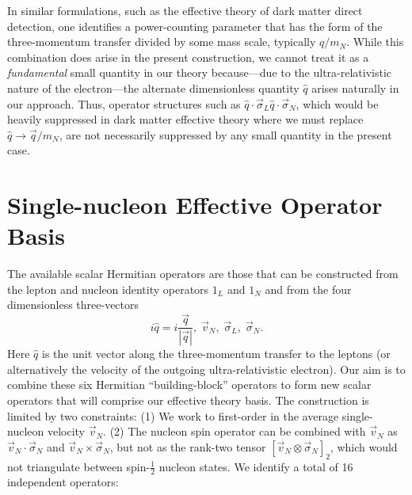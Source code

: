 \documentclass{book}[letterpaper,12pt]
\begin{document}
In similar formulations, such as the effective theory of dark matter direct detection, one identifies a power-counting parameter that has the form of the three-momentum transfer divided by some mass scale, typically $q/m_N$. While this combination does arise in the present construction, we cannot treat it as a \textit{fundamental} small quantity in our theory because---due to the ultra-relativistic nature of the electron---the alternate dimensionless quantity $\hat{q}$ arises naturally in our approach. Thus, operator structures such as $\hat{q}\cdot\vec{\sigma}_L\hat{q}\cdot\vec{\sigma}_N$, which would be heavily suppressed in dark matter effective theory where we must replace $\hat{q}\rightarrow \vec{q}/m_N$, are not necessarily suppressed by any small quantity in the present case.


\section{Single-nucleon Effective Operator Basis}
The available scalar Hermitian operators are those that can be constructed from the lepton and nucleon identity operators $1_L$ and $1_N$ and from the four dimensionless three-vectors
\begin{equation}
i\hat{q}=i\frac{\vec{q}}{|\vec{q}|},\;\vec{v}_N,\;\vec{\sigma}_L,\;\vec{\sigma}_N.
\end{equation}
Here $\hat{q}$ is the unit vector along the three-momentum transfer to the leptons (or alternatively the velocity of the outgoing ultra-relativistic electron). Our aim is to combine these six Hermitian ``building-block'' operators to form new scalar operators that will comprise our effective theory basis. The construction is limited by two constraints: (1) We work to first-order in the average single-nucleon velocity $\vec{v}_N$. (2) The nucleon spin operator can be combined with $\vec{v}_N$ as $\vec{v}_N\cdot\vec{\sigma}_N$ and $\vec{v}_N\times\vec{\sigma}_N$, but not as the rank-two tensor $\left[\vec{v}_N\otimes\vec{\sigma}_N\right]_2$, which would not triangulate between spin-$\frac{1}{2}$ nucleon states. We identify a total of 16 independent operators:
\end{document}
